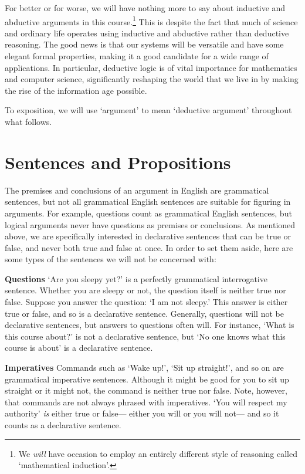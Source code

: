 For better or for worse, we will have nothing more to say about inductive and abductive arguments in this course.\footnote{We \textit{will} have occasion to employ an entirely different style of reasoning called `mathematical induction'.}
This is despite the fact that much of science and ordinary life operates using inductive and abductive rather than deductive reasoning.
The good news is that our systems will be versatile and have some elegant formal properties, making it a good candidate for a wide range of applications.
In particular, deductive logic is of vital importance for mathematics and computer science, significantly reshaping the world that we live in by making the rise of the information age possible.

To exposition, we will use `argument' to mean `deductive argument' throughout what follows.






\section{Sentences and Propositions}
\label{intro.sentences}

The premises and conclusions of an argument in English are grammatical sentences, but not all grammatical English sentences are suitable for figuring in arguments.
For example, questions count as grammatical English sentences, but logical arguments never have questions as premises or conclusions.
As mentioned above, we are specifically interested in declarative sentences that can be true or false, and never both true and false at once.
In order to set them aside, here are some types of the sentences we will not be concerned with:

\textbf{Questions} `Are you sleepy yet?' is a perfectly grammatical interrogative sentence.
Whether you are sleepy or not, the question itself is neither true nor false.
Suppose you answer the question: `I am not sleepy.'
This answer is either true or false, and so is a declarative sentence.
Generally, questions will not be declarative sentences, but answers to questions often will. 
For instance, `What is this course about?' is not a declarative sentence, but `No one knows what this course is about' is a declarative sentence.

\textbf{Imperatives} Commands such as `Wake up!', `Sit up straight!', and so on are grammatical imperative sentences.
Although it might be good for you to sit up straight or it might not, the command is neither true nor false.
Note, however, that commands are not always phrased with imperatives.
`You will respect my authority' \emph{is} either true or false--- either you will or you will not--- and so it counts as a declarative sentence.

